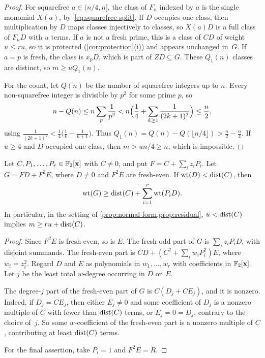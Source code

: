 \begin{proof}
For squarefree $a\in(n/4,n]$, the class of $F_n$ indexed by $a$ is the single monomial $X(a)$, by~\eqref{eq:squarefree-split}. If $D$ occupies one class, then multiplication by $D$ maps classes injectively to classes, so $X(a)D$ is a full class of $F_nD$ with $u$ terms. If $a$ is not a fresh prime, this is a class of $CD$ of weight $u\le ru$, so it is protected (\cref{cor:protection}(i)) and appears unchanged in~$G$. If $a=p$ is fresh, the class is $x_pD$, which is part of $ZD\subseteq G$. These $Q_1(n)$ classes are distinct, so $m\ge uQ_1(n)$.

For the count, let $Q(n)$ be the number of squarefree integers up to $n$. Every non-squarefree integer is divisible by $p^2$ for some prime $p$, so
\[
 n-Q(n)\le n\sum_{p}\frac1{p^2}<n\Bigl(\frac14+\sum_{k\ge1}\frac1{(2k+1)^2}\Bigr)\le\frac n2 ,
\]
using $\frac1{(2k+1)^2}<\frac14\bigl(\frac1k-\frac1{k+1}\bigr)$. Thus $Q_1(n)=Q(n)-Q(\lfloor n/4\rfloor)>\frac n2-\frac n4$. If $u\ge4$ and $D$ occupied one class, then $m>un/4\ge n$, which is impossible.
\end{proof}

\begin{lemma}\label{lem:core}
Let $C,P_1,\dots,P_r\in\mathbb{F}_2[\mathbf{x}]$ with $C\ne0$, and put $F=C+\sum_iz_iP_i$. Let $G=FD+F^2E$, where $D\ne0$ and $F^2E$ are fresh-even. If $\operatorname{wt}(D)<\operatorname{dist}(C)$, then
\[
 \operatorname{wt}(G)\ge\operatorname{dist}(C)+\sum_{i=1}^r\operatorname{wt}(P_iD).
\]
In particular, in the setting of \cref{prop:normal-form,prop:residual}, $u<\operatorname{dist}(C)$ implies $m\ge ru+\operatorname{dist}(C)$.
\end{lemma}

\begin{proof}
Since $F^2E$ is fresh-even, so is $E$. The fresh-odd part of $G$ is $\sum_iz_iP_iD$, with disjoint summands. The fresh-even part is $CD+(C^2+\sum_iw_iP_i^2)E$, where $w_i=z_i^2$. Regard $D$ and $E$ as polynomials in $w_1,\dots,w_r$ with coefficients in $\mathbb{F}_2[\mathbf{x}]$. Let $j$ be the least total $w$-degree occurring in $D$ or~$E$.

The degree-$j$ part of the fresh-even part of $G$ is $C(D_j+CE_j)$, and it is nonzero. Indeed, if $D_j=CE_j$, then either $E_j\ne0$ and some coefficient of $D_j$ is a nonzero multiple of $C$ with fewer than $\operatorname{dist}(C)$ terms, or $E_j=0=D_j$, contrary to the choice of~$j$. So some $w$-coefficient of the fresh-even part is a nonzero multiple of $C$, contributing at least $\operatorname{dist}(C)$ terms.

For the final assertion, take $P_i=1$ and $F^2E=R$.
\end{proof}

